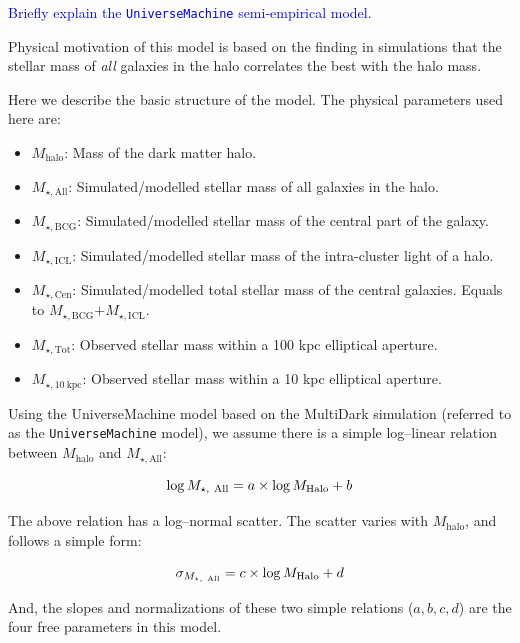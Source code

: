 \documentclass[a4paper,fleqn,usenatbib]{mnras}
\def\mhalo{{$M_{\mathrm{halo}}$}}
\def\mtot{{$M_{\star,\mathrm{Tot}}$}}
\def\minn{{$M_{\star,10\ \mathrm{kpc}}$}}
\def\mall{{$M_{\star,\mathrm{All}}$}}
\def\mbcg{{$M_{\star,\mathrm{BCG}}$}}
\def\micl{{$M_{\star,\mathrm{ICL}}$}}
\def\mcen{{$M_{\star,\mathrm{Cen}}$}}
\def\um{\texttt{UniverseMachine}}
\newcommand{\plan}[1]{\textcolor{blue}{#1}}
\begin{document}
    \plan{Briefly explain the \um{} semi-empirical model.}

    Physical motivation of this model is based on the finding in simulations that the 
    stellar mass of \emph{all} galaxies in the halo correlates the best with the 
    halo mass. 

    Here we describe the basic structure of the model. 
    The physical parameters used here are: 

    \begin{itemize}
    
        \item \mhalo{}: Mass of the dark matter halo. 
        \item \mall{}: Simulated/modelled stellar mass of all galaxies in the halo.
        \item \mbcg{}: Simulated/modelled stellar mass of the central part of the 
            galaxy.
        \item \micl{}: Simulated/modelled stellar mass of the intra-cluster light of 
            a halo. 
        \item \mcen{}: Simulated/modelled total stellar mass of the central galaxies. 
            Equals to \mbcg{}$+$\micl{}.
        \item \mtot{}: Observed stellar mass within a 100 kpc elliptical aperture. 
        \item \minn{}: Observed stellar mass within a 10 kpc elliptical aperture. 

    \end{itemize}
    
    Using the UniverseMachine model based on the MultiDark simulation (referred to 
    as the \um{} model), we assume there is a simple log--linear relation between 
    \mhalo{} and \mall{}: 

    \begin{equation}
        \log M_{\star,\ \mathrm{All}} = a \times \log M_{\rm Halo} + b 
    \end{equation}

    The above relation has a log--normal scatter.  
    The scatter varies with \mhalo{}, and follows a simple form: 

    \begin{equation}
        \sigma_{M_{\star,\ \mathrm{All}}} = c \times \log M_{\rm Halo} + d 
    \end{equation}

    And, the slopes and normalizations of these two simple relations ($a, b, c, d$) 
    are the four free parameters in this model.
\end{document}
